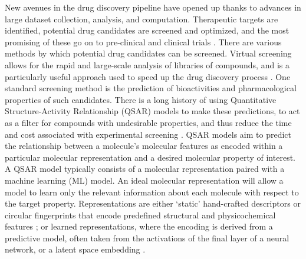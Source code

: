 New avenues in the drug discovery pipeline have opened up thanks to advances in large dataset collection, analysis, and computation. Therapeutic targets are identified, potential drug candidates are screened and optimized, and the most promising of these go on to pre-clinical and clinical trials \citep{Lill2007}. There are various methods by which potential drug candidates can be screened. Virtual screening allows for the rapid and large-scale analysis of libraries of compounds, and is a particularly useful approach used to speed up the drug discovery process \citep{Neves2018}. One standard screening method is the prediction of bioactivities and pharmacological properties of such candidates. There is a long history of using Quantitative Structure-Activity Relationship (QSAR) models to make these predictions, to act as a filter for compounds with undesirable properties, and thus reduce the time and cost associated with experimental screening \citep{Sabando2021}. QSAR models aim to predict the relationship between a molecule's molecular features as encoded within a particular molecular representation and a desired molecular property \citep{Sabando2021} of interest. A QSAR model typically consists of a molecular representation paired with a machine learning (ML) model. An ideal molecular representation will allow a model to learn only the relevant information about each molecule with respect to the target property. Representations are either `static' hand-crafted descriptors or circular fingerprints that encode predefined structural and physicochemical features \citep{rogers2010, David2020, sns, avalon}; or learned representations, where the encoding is derived from a predictive model, often taken from the activations of the final layer of a neural network, or a latent space embedding \citep{Sabando2021, kishimoto2023}. 

